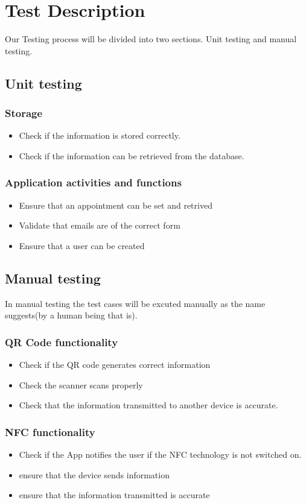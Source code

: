 \documentclass[english]{article}
\begin{document}
	\section{Test Description}
	Our Testing process will be divided into two sections. Unit testing and manual testing. 
	\subsection {Unit testing}
			\subsubsection{Storage}
		\begin{itemize} 
			\item Check if the information is stored correctly.
			\item Check if the information can be retrieved from the database.
		\end{itemize}
			\subsubsection{Application activities and functions}
			\begin{itemize}
				\item Ensure that an appointment can be set and retrived
				\item Validate that emails are of the correct form 
				\item Ensure that a user can be created
			\end{itemize}
	
	\subsection {Manual testing}
	In manual testing the test cases will be excuted manually as the name suggests(by a human being that is). 
		\subsubsection{QR Code functionality}
		\begin{itemize} 
			\item Check if the QR code generates correct information
			\item Check the scanner scans properly
			\item Check that the information transmitted to another device is accurate. 
		\end{itemize}
		
		\subsubsection{NFC functionality}
		\begin{itemize} 
			\item Check if the App notifies the user if the NFC technology is not switched on.
			\item ensure that the device sends information
			\item ensure that the information transmitted is accurate
		\end{itemize}
\end{document}

